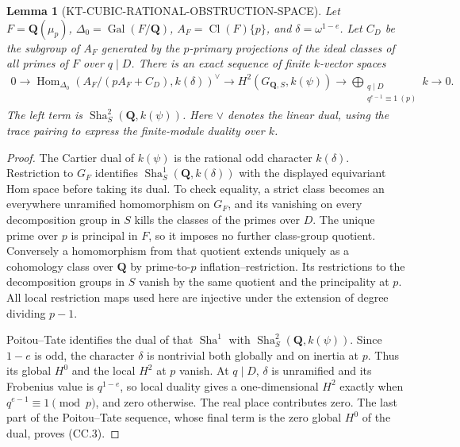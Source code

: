 \documentclass[11pt,a4paper]{article}
\newtheorem{lemma}[theorem]{Lemma}
\theoremstyle{definition}
\newcommand{\Sha}{\operatorname{Sha}}
\begin{document}
\begin{lemma}[KT-CUBIC-RATIONAL-OBSTRUCTION-SPACE]
Let $F=\mathbf Q(\mu_p)$, $\Delta_0=\operatorname{Gal}(F/\mathbf Q)$,
$A_F=\operatorname{Cl}(F)\{p\}$, and $\delta=\omega^{1-e}$.
Let $C_D$ be the subgroup of $A_F$ generated by the $p$-primary
projections of the ideal classes of all primes of $F$ over $q\mid D$.
There is an exact sequence of finite $k$-vector spaces
\[
\begin{split}
0\longrightarrow
 \operatorname{Hom}_{\Delta_0}
   (A_F/(pA_F+C_D),k(\delta))^\vee
\longrightarrow H^2(G_{\mathbf Q,S},k(\psi))
\longrightarrow
 \bigoplus_{\substack{q\mid D\\q^{e-1}\equiv1\ (p)}}k
\longrightarrow0 .
\end{split}                                               \tag{CC.3}
\]
The left term is $\Sha^2_S(\mathbf Q,k(\psi))$.
Here $\vee$ denotes the linear dual, using the trace pairing
to express the finite-module duality over $k$.
\end{lemma}
\begin{proof}
The Cartier dual of $k(\psi)$ is the rational odd character
$k(\delta)$.  Restriction to $G_F$ identifies
$\Sha^1_S(\mathbf Q,k(\delta))$ with the displayed equivariant
Hom space before taking its dual.  To check equality, a strict
class becomes an everywhere unramified homomorphism on $G_F$,
and its vanishing on every decomposition group in $S$ kills the
classes of the primes over $D$.  The unique prime over $p$ is
principal in $F$, so it imposes no further class-group quotient.
Conversely a homomorphism from that quotient extends uniquely
as a cohomology class over $\mathbf Q$ by prime-to-$p$
inflation--restriction.  Its restrictions to the decomposition
groups in $S$ vanish by the same quotient and the principality
at $p$.  All local restriction maps used here are injective
under the extension of degree dividing $p-1$.

Poitou--Tate identifies the dual of that $\Sha^1$ with
$\Sha^2_S(\mathbf Q,k(\psi))$.  Since $1-e$ is odd, the
character $\delta$ is nontrivial both globally and on inertia
at $p$.  Thus its global $H^0$ and the local $H^2$ at $p$
vanish.  At $q\mid D$, $\delta$ is unramified and its Frobenius
value is $q^{1-e}$, so local duality gives a one-dimensional
$H^2$ exactly when $q^{e-1}\equiv1\pmod p$, and zero otherwise.
The real place contributes zero.  The last part of the
Poitou--Tate sequence, whose final term is the zero global
$H^0$ of the dual, proves (CC.3).
\end{proof}
\end{document}
